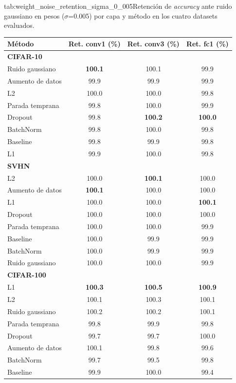 \begin{table}{tab:weight_noise_retention_sigma_0_005}{Retención de \textit{accuracy} ante ruido gaussiano en pesos ($\sigma$=0.005) por capa y método en los cuatro datasets evaluados.}
\small
\begin{tabular}{lccc}
\toprule
\textbf{Método} & \textbf{Ret. conv1 (\%)} & \textbf{Ret. conv3 (\%)} & \textbf{Ret. fc1 (\%)} \\
\midrule
\multicolumn{4}{l}{\textbf{CIFAR-10}}\\
\midrule
Ruido gaussiano & \textbf{100.1} & 100.1 & 99.9 \\
Aumento de datos & 99.9 & 99.9 & 99.9 \\
L2 & 100.0 & 100.0 & 99.8 \\
Parada temprana & 99.8 & 100.0 & 99.9 \\
Dropout & 99.8 & \textbf{100.2} & \textbf{100.0} \\
BatchNorm & 99.8 & 100.0 & 99.8 \\
Baseline & 99.8 & 99.9 & 99.8 \\
L1 & 99.9 & 100.0 & 99.8 \\
\midrule
\multicolumn{4}{l}{\textbf{SVHN}}\\
\midrule
L2 & 100.0 & \textbf{100.1} & 100.0 \\
Aumento de datos & \textbf{100.1} & 100.0 & 100.0 \\
L1 & 100.0 & 100.0 & \textbf{100.1} \\
Dropout & 100.0 & 100.0 & 100.0 \\
Parada temprana & 100.0 & 100.0 & 99.9 \\
Baseline & 100.0 & 99.9 & 99.9 \\
BatchNorm & 100.0 & 99.9 & 99.9 \\
Ruido gaussiano & 100.0 & 100.0 & 99.9 \\
\midrule
\multicolumn{4}{l}{\textbf{CIFAR-100}}\\
\midrule
L1 & \textbf{100.3} & \textbf{100.5} & \textbf{100.9} \\
L2 & 100.1 & 100.3 & 100.1 \\
Ruido gaussiano & 100.2 & 100.2 & 100.1 \\
Parada temprana & 99.8 & 99.9 & 99.8 \\
Dropout & 99.7 & 99.7 & 100.0 \\
Aumento de datos & 100.1 & 99.8 & 99.6 \\
BatchNorm & 99.7 & 99.5 & 99.8 \\
Baseline & 99.9 & 100.0 & 99.4 \\

\end{tabular}
\end{table}
